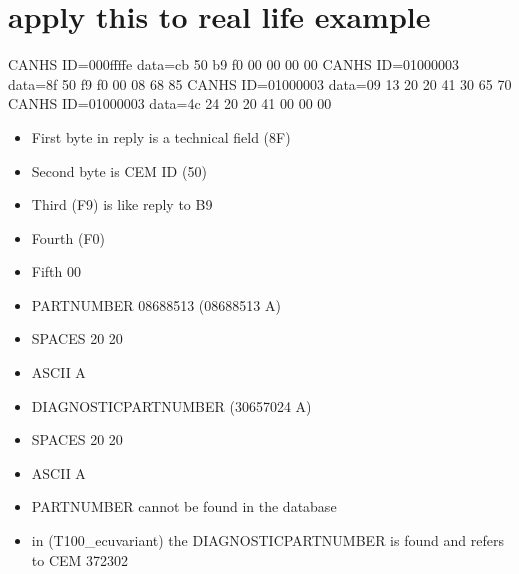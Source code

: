 \documentclass[letterpaper,10pt,english]{sphinxmanual}
\begin{document}
\section{apply this to real life example}
\label{\detokenize{makingsense/respons:apply-this-to-real-life-example}}
\begin{sphinxVerbatim}[commandchars=\\\{\}]
CAN\PYGZus{}HS \PYGZhy{}\PYGZhy{}\PYGZhy{}\PYGZgt{} ID=000ffffe data=cb 50 b9 f0 00 00 00 00
CAN\PYGZus{}HS \PYGZlt{}\PYGZhy{}\PYGZhy{}\PYGZhy{} ID=01000003 data=8f 50 f9 f0 00 08 68 85
CAN\PYGZus{}HS \PYGZlt{}\PYGZhy{}\PYGZhy{}\PYGZhy{} ID=01000003 data=09 13 20 20 41 30 65 70
CAN\PYGZus{}HS \PYGZlt{}\PYGZhy{}\PYGZhy{}\PYGZhy{} ID=01000003 data=4c 24 20 20 41 00 00 00
\end{sphinxVerbatim}
\begin{itemize}
\item {} 
\sphinxAtStartPar
First byte in reply is a technical field (8F)

\item {} 
\sphinxAtStartPar
Second byte is CEM ID (50)

\item {} 
\sphinxAtStartPar
Third (F9) is like reply to B9

\item {} 
\sphinxAtStartPar
Fourth (F0)

\item {} 
\sphinxAtStartPar
Fifth 00

\item {} 
\sphinxAtStartPar
PARTNUMBER  08688513  (08688513  A)

\item {} 
\sphinxAtStartPar
SPACES 20 20

\item {} 
\sphinxAtStartPar
ASCII A

\item {} 
\sphinxAtStartPar
DIAGNOSTICPARTNUMBER  (30657024  A)

\item {} 
\sphinxAtStartPar
SPACES 20 20

\item {} 
\sphinxAtStartPar
ASCII A

\item {} 
\sphinxAtStartPar
PARTNUMBER cannot be found in the database 

\item {} 
\sphinxAtStartPar
in (T100\_ecuvariant) the DIAGNOSTICPARTNUMBER is found and refers to  CEM 372302

\end{itemize}
\end{document}
